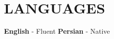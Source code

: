 \section{LANGUAGES}
\textbf{English} - Fluent \enspace \enspace \textbf{Persian} - Native \enspace \enspace 